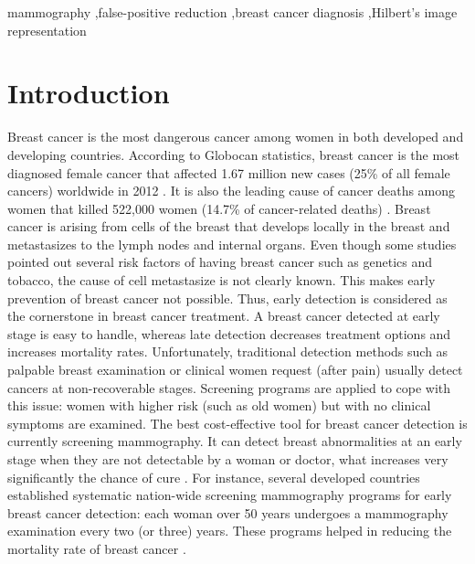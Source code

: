 \documentclass[review,12pt]{elsarticle}
\begin{document}
\begin{frontmatter}
\begin{abstract}
\end{abstract}

\begin{keyword}
mammography \sep false-positive reduction \sep breast cancer diagnosis \sep Hilbert’s image representation


\end{keyword}

\end{frontmatter}

\section{Introduction}

Breast cancer is the most dangerous cancer among women in both developed and developing countries. According to Globocan statistics, breast cancer is the most diagnosed female cancer that affected 1.67 million new cases (25\% of all female cancers) worldwide in 2012 \citep{Ferlay2012}. It is also the leading cause of cancer deaths among women that killed 522,000 women (14.7\% of cancer-related deaths) \citep{Dhahbi2015}. Breast cancer is arising from cells of the breast that develops locally in the breast and metastasizes to the lymph nodes and internal organs. Even though some studies pointed out several risk factors of having breast cancer such as genetics and tobacco, the cause of cell metastasize is not clearly known. This makes early prevention of breast cancer not possible. Thus, early detection is considered as the cornerstone in breast cancer treatment. A breast cancer detected at early stage is easy to handle, whereas late detection decreases treatment options and increases mortality rates. Unfortunately, traditional detection methods such as palpable breast examination or clinical women request (after pain) usually detect cancers at non-recoverable stages. Screening programs are applied to cope with this issue: women with higher risk (such as old women) but with no clinical symptoms are examined. The best cost-effective tool for breast cancer detection is currently screening mammography. It can detect breast abnormalities at an early stage when they are not detectable by a woman or doctor, what increases very significantly the chance of cure \citep{Jotwani2009}. For instance, several developed countries established systematic nation-wide screening mammography programs for early breast cancer detection: each woman over 50 years undergoes a mammography examination every two (or three) years.  These programs helped in reducing the mortality rate of breast cancer \citep{Nelson2009,Hofvind2009}.
\end{document}
